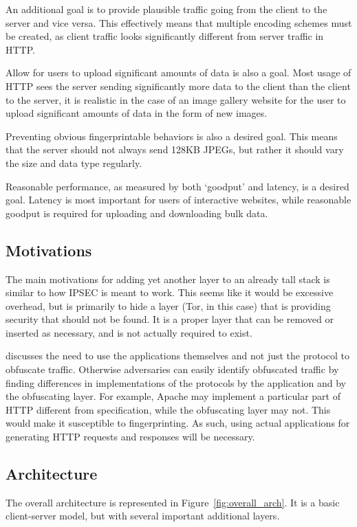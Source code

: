 An additional goal is to provide plausible traffic going from the client to the server and vice versa. This effectively means that multiple encoding schemes must be created, as client traffic looks significantly different from server traffic in HTTP. 

Allow for users to upload significant amounts of data is also a goal. Most usage of HTTP sees the server sending significantly more data to the client than the client to the server, it is realistic in the case of an image gallery website for the user to upload significant amounts of data in the form of new images.

Preventing obvious fingerprintable behaviors is also a desired goal. This means that the server should not always send 128KB JPEGs, but rather it should vary the size and data type regularly.  

Reasonable performance, as measured by both `goodput' and latency, is a desired goal. Latency is most important for users of interactive websites, while reasonable goodput is required for uploading and downloading bulk data. 

\subsection{Motivations}
The main motivations for adding yet another layer to an already tall stack is similar to how IPSEC is meant to work. This seems like it would be excessive overhead, but is primarily to hide a layer (Tor, in this case) that is providing security that should not be found. It is a proper layer that can be removed or inserted as necessary, and is not actually required to exist. 

\cite{Ref2} discusses the need to use the applications themselves and not just the protocol to obfuscate traffic. Otherwise adversaries can easily identify obfuscated traffic by finding differences in implementations of the protocols by the application and by the obfuscating layer. For example, Apache may implement a particular part of HTTP different from specification, while the obfuscating layer may not. This would make it susceptible to fingerprinting. As such, using actual applications for generating HTTP requests and responses will be necessary.

\subsection{Architecture}
The overall architecture is represented in Figure~\ref{fig:overall_arch}. It is a basic client-server model, but with several important additional layers.

